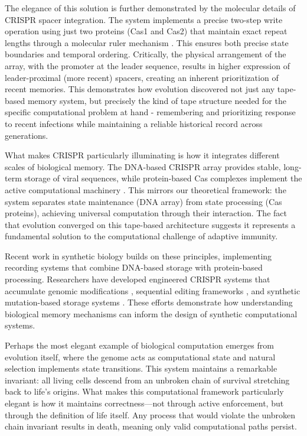 \documentclass[12pt]{article}
\begin{document}
The elegance of this solution is further demonstrated by the molecular details of CRISPR spacer integration.
The system implements a precise two-step write operation using just two proteins (Cas1 and Cas2) that maintain exact repeat lengths through a molecular ruler mechanism \cite{kim2019crispr}.
This ensures both precise state boundaries and temporal ordering.
Critically, the physical arrangement of the array, with the promoter at the leader sequence, results in higher expression of leader-proximal (more recent) spacers, creating an inherent prioritization of recent memories.
This demonstrates how evolution discovered not just any tape-based memory system, but precisely the kind of tape structure needed for the specific computational problem at hand - remembering and prioritizing response to recent infections while maintaining a reliable historical record across generations.

What makes CRISPR particularly illuminating is how it integrates different scales of biological memory.
The DNA-based CRISPR array provides stable, long-term storage of viral sequences, while protein-based Cas complexes implement the active computational machinery \cite{sadremomtaz2023digital}.
This mirrors our theoretical framework: the system separates state maintenance (DNA array) from state processing (Cas proteins), achieving universal computation through their interaction.
The fact that evolution converged on this tape-based architecture suggests it represents a fundamental solution to the computational challenge of adaptive immunity.

Recent work in synthetic biology builds on these principles, implementing recording systems that combine DNA-based storage with protein-based processing.
Researchers have developed engineered CRISPR systems that accumulate genomic modifications \cite{sheth2017multiplex}, sequential editing frameworks \cite{choi2022time}, and synthetic mutation-based storage systems \cite{sadremomtaz2023digital}.
These efforts demonstrate how understanding biological memory mechanisms can inform the design of synthetic computational systems.

Perhaps the most elegant example of biological computation emerges from evolution itself, where the genome acts as computational state and natural selection implements state transitions.
This system maintains a remarkable invariant: all living cells descend from an unbroken chain of survival stretching back to life's origins.
What makes this computational framework particularly elegant is how it maintains correctness---not through active enforcement, but through the definition of life itself.
Any process that would violate the unbroken chain invariant results in death, meaning only valid computational paths persist.
\end{document}
